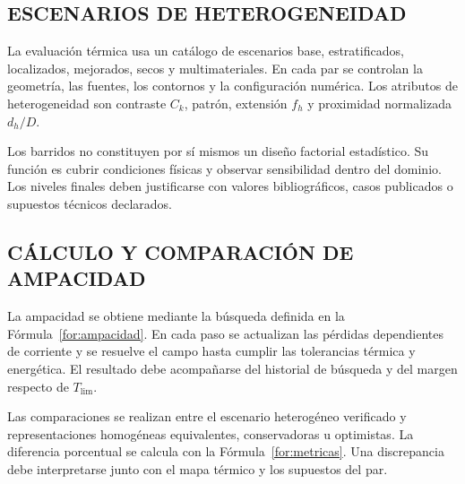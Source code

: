 
\subsection{ESCENARIOS DE HETEROGENEIDAD}

La evaluación térmica usa un catálogo de escenarios base, estratificados, localizados, mejorados, secos y multimateriales. En cada par se controlan la geometría, las fuentes, los contornos y la configuración numérica. Los atributos de heterogeneidad son contraste $C_k$, patrón, extensión $f_h$ y proximidad normalizada $d_h/D$.

Los barridos no constituyen por sí mismos un diseño factorial estadístico. Su función es cubrir condiciones físicas y observar sensibilidad dentro del dominio. Los niveles finales deben justificarse con valores bibliográficos, casos publicados o supuestos técnicos declarados.


\subsection{CÁLCULO Y COMPARACIÓN DE AMPACIDAD}

La ampacidad se obtiene mediante la búsqueda definida en la Fórmula~\ref{for:ampacidad}. En cada paso se actualizan las pérdidas dependientes de corriente y se resuelve el campo hasta cumplir las tolerancias térmica y energética. El resultado debe acompañarse del historial de búsqueda y del margen respecto de $T_{\mathrm{lim}}$.

Las comparaciones se realizan entre el escenario heterogéneo verificado y representaciones homogéneas equivalentes, conservadoras u optimistas. La diferencia porcentual se calcula con la Fórmula~\ref{for:metricas}. Una discrepancia debe interpretarse junto con el mapa térmico y los supuestos del par.



